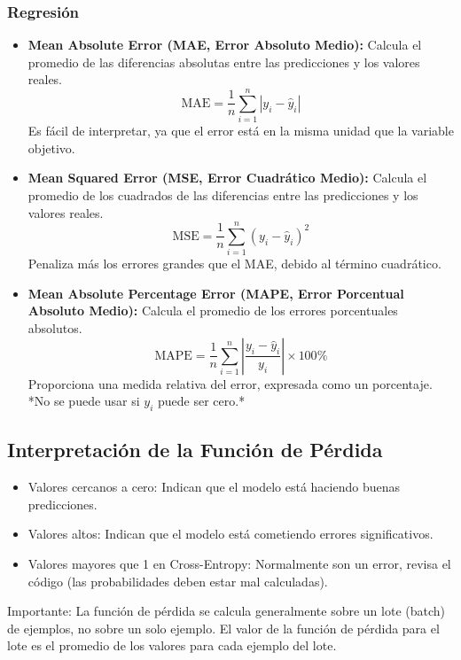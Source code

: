 \documentclass{article}
\begin{document}
\subsubsection{Regresión}
\begin{itemize}
    \item \textbf{Mean Absolute Error (MAE, Error Absoluto Medio):}  Calcula el promedio de las diferencias absolutas entre las predicciones y los valores reales.
        \[
        \text{MAE} = \frac{1}{n} \sum_{i=1}^{n} |y_i - \hat{y}_i|
        \]
      Es fácil de interpretar, ya que el error está en la misma unidad que la variable objetivo.

    \item \textbf{Mean Squared Error (MSE, Error Cuadrático Medio):}  Calcula el promedio de los cuadrados de las diferencias entre las predicciones y los valores reales.
        \[
        \text{MSE} = \frac{1}{n} \sum_{i=1}^{n} (y_i - \hat{y}_i)^2
        \]
        Penaliza más los errores grandes que el MAE, debido al término cuadrático.

    \item \textbf{Mean Absolute Percentage Error (MAPE, Error Porcentual Absoluto Medio):} Calcula el promedio de los errores porcentuales absolutos.
        \[
        \text{MAPE} = \frac{1}{n} \sum_{i=1}^{n} \left| \frac{y_i - \hat{y}_i}{y_i} \right| \times 100\%
        \]
        Proporciona una medida relativa del error, expresada como un porcentaje.  *No se puede usar si \(y_i\) puede ser cero.*
\end{itemize}

\subsection{Interpretación de la Función de Pérdida}

\begin{itemize}
    \item Valores cercanos a cero: Indican que el modelo está haciendo buenas predicciones.
    \item Valores altos: Indican que el modelo está cometiendo errores significativos.
    \item Valores mayores que 1 en Cross-Entropy: Normalmente son un error, revisa el código (las probabilidades deben estar mal calculadas).
    
\end{itemize}

Importante: La función de pérdida se calcula generalmente sobre un lote (batch) de ejemplos, no sobre un solo ejemplo.  El valor de la función de pérdida para el lote es el promedio de los valores para cada ejemplo del lote.
\end{document}
